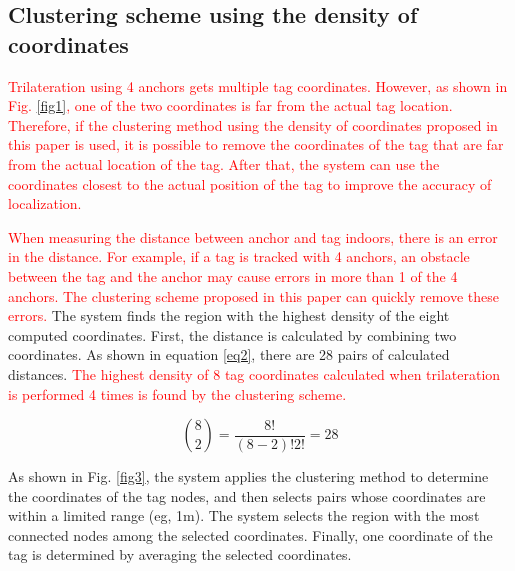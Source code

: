 \documentclass[conference]{IEEEtran}
\begin{document}
\subsection{Clustering scheme using the density of coordinates}
\textcolor{red}{Trilateration using 4 anchors gets multiple tag coordinates. However, as shown in Fig. \ref{fig1}, one of the two coordinates is far from the actual tag location. Therefore, if the clustering method using the density of coordinates proposed in this paper is used, it is possible to remove the coordinates of the tag that are far from the actual location of the tag. After that, the system can use the coordinates closest to the actual position of the tag to improve the accuracy of localization.}

\textcolor{red}{When measuring the distance between anchor and tag indoors, there is an error in the distance. For example, if a tag is tracked with 4 anchors, an obstacle between the tag and the anchor may cause errors in more than 1 of the 4 anchors. The clustering scheme proposed in this paper can quickly remove these errors.} The system finds the region with the highest density of the eight computed coordinates. First, the distance is calculated by combining two coordinates. As shown in equation \ref{eq2}, there are 28 pairs of calculated distances. \textcolor{red}{The highest density of 8 tag coordinates calculated when trilateration is performed 4 times is found by the clustering scheme.}

\begin{equation}
    \binom{8}{2} = \frac{8!}{(8-2)!2!}=28\label{eq2}
\end{equation}

As shown in Fig. \ref{fig3}, the system applies the clustering method to determine the coordinates of the tag nodes, and then selects pairs whose coordinates are within a limited range (eg, 1m). The system selects the region with the most connected nodes among the selected coordinates. Finally, one coordinate of the tag is determined by averaging the selected coordinates.
\end{document}
